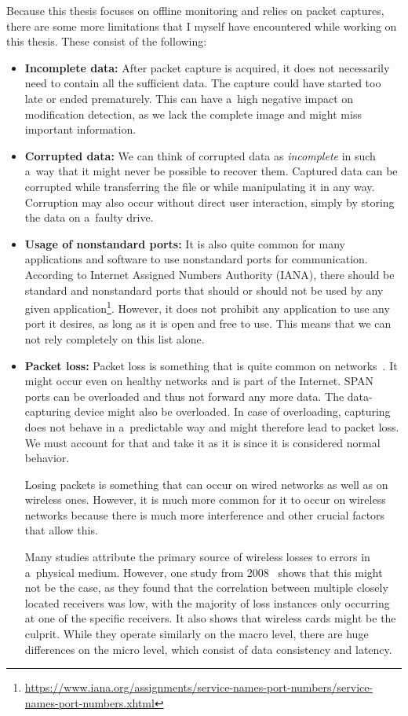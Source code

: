 \documentclass[
  printed,     %
  color,       %
  oneside,     %
  nosansbold,  %
  nocolorbold, %
  nolof,         %
  nolot,         %
]{fithesis4}
\begin{document}
Because this thesis focuses on offline monitoring and relies on packet captures, there are some more limitations that I myself have encountered while working on this thesis. These consist of the following:
\begin{itemize}
\item \textbf{Incomplete data:} After packet capture is acquired, it does not necessarily need to contain all the sufficient data. The capture could have started too late or ended prematurely. This can have a~high negative impact on modification detection, as we lack the complete image and might miss important information.

\item \textbf{Corrupted data:} We can think of corrupted data as \textit{incomplete} in such a~way that it might never be possible to recover them. Captured data can be corrupted while transferring the file or while manipulating it in any way. Corruption may also occur without direct user interaction, simply by storing the data on a~faulty drive.

\item \textbf{Usage of nonstandard ports:} It is also quite common for many applications and software to use nonstandard ports for communication. According to Internet Assigned Numbers Authority (IANA), there should be standard and nonstandard ports that should or should not be used by any given application\footnote{\url{https://www.iana.org/assignments/service-names-port-numbers/service-names-port-numbers.xhtml}}. However, it does not prohibit any application to use any port it desires, as long as it is open and free to use. This means that we can not rely completely on this list alone.

\item \textbf{Packet loss:} Packet loss is something that is quite common on networks~\cite{4594875}. It might occur even on healthy networks and is part of the Internet. SPAN ports can be overloaded and thus not forward any more data. The data-capturing device might also be overloaded. In case of overloading, capturing does not behave in a~predictable way and might therefore lead to packet loss. We must account for that and take it as it is since it is considered normal behavior.

Losing packets is something that can occur on wired networks as well as on wireless ones. However, it is much more common for it to occur on wireless networks because there is much more interference and other crucial factors that allow this.

Many studies attribute the primary source of wireless losses to errors in a~physical medium. However, one study from 2008~\cite{4594875} shows that this might not be the case, as they found that the correlation between multiple closely located receivers was low, with the majority of loss instances only occurring at one of the specific receivers. It also shows that wireless cards might be the culprit. While they operate similarly on the macro level, there are huge differences on the micro level, which consist of data consistency and latency.

\end{itemize}
\end{document}
